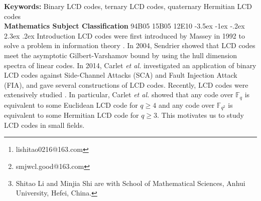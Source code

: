 \documentclass[12pt,twoside]{article}
\date{}
\makeatletter
\renewcommand\title[1]{\gdef\@title{\reset@font\Large\bfseries #1}}
\renewcommand\section{\@startsection {section}{1}{\z@}%
                                   {-3.5ex \@plus -1ex \@minus -.2ex}%
                                   {2.3ex \@plus.2ex}%
                                   {\normalfont\large\bfseries}}
\newcommand{\F}{\mathbb{F}}
\theoremstyle{plain}
\theoremstyle{definition}
\theoremstyle{remark}
\makeatother
\begin{document}
  \title{Improved lower and upper bounds for LCD codes\thanks{This research is supported by the National Natural Science Foundation of China (12071001) and 2021 University Graduate Research Project (Y020410077).}}
\author{ Shitao Li\thanks{lishitao0216@163.com}, Minjia Shi\thanks{smjwcl.good@163.com}
\thanks{ Shitao Li and Minjia Shi are with School of Mathematical Sciences, Anhui University, Hefei, China.}}

\date{}
    \maketitle

\begin{abstract}
Linear complementary dual (LCD) codes are linear codes which intersect their dual codes trivially, which have been
of interest and extensively studied due to its wide applications.
In this paper, we give some methods for constructing LCD codes over small fields by modifying some known methods. We show that all odd-like binary LCD codes, ternary LCD codes and quaternary Hermitian LCD codes can be constructed by the modified methods. Using these methods, we construct a lot of optimal binary LCD codes, ternary LCD codes and quaternary Hermitian LCD codes, which improve the known lower bounds on the largest minimum weights. Furthermore, we give two counterexamples to show that the conjecture proposed by Bouyuklieva (Des. Codes Cryptogr. 89(11): 2445-2461, 2021) is invalid.
\end{abstract}
{\bf Keywords:} Binary LCD codes, ternary LCD codes, quaternary Hermitian LCD codes\\
{\bf Mathematics Subject Classification} 94B05 15B05 12E10
\section{Introduction}
LCD codes were first introduced by Massey in 1992 to solve a problem in information theory \cite{LCD-7}.
In 2004, Sendrier \cite{LCD-is-good} showed that LCD codes meet the asymptotic Gilbert-Varshamov bound by using the hull dimension spectra of linear codes.
In 2014, Carlet {\it{et al.}} \cite{lcd-appl} investigated an application of binary LCD codes against Side-Channel Attacks (SCA) and Fault Injection Attack (FIA), and gave several constructions of LCD codes.
Recently, LCD codes were extensively studied \cite{LCD-1,LCD-new,LCD-2,LCD-3,
LCD-5,LCD-9,LCD-huang,ACD-E-codes,LCD-T-matric,LCD-zhu}.
In particular, Carlet {\it{et al.}} \cite{LCD-1} showed that any code
over $\F_q$ is equivalent to some Euclidean LCD code for $q\geq 4$ and any code over $\F_{q^2}$ is
equivalent to some Hermitian LCD code for $q\geq 3$. This motivates us to study
LCD codes in small fields.
\end{document}
